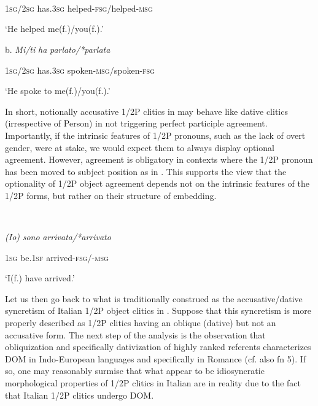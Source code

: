 \documentclass[output=paper]{langscibook}
\begin{document}
 
\\

\ea\label{ex:key:}
{}\\
\z
\ea\label{ex:key:}
\\
  \textsc{1sg/2sg}  has\textsc{.3sg}    helped\textsc{{}-fsg/}helped\textsc{{}-msg}

  ‘He helped me(f.)/you(f.).’

  b.  \textit{Mi/ti}        \textit{ha}     \textit{parlato/*parlata}

  \textsc{1sg/2sg}  has\textsc{.3sg}    spoken\textsc{{}-msg/}spoken\textsc{{}-fsg}

  ‘He spoke to me(f.)/you(f.).’
\z 

In short, notionally accusative 1/2P clitics in  may behave like dative clitics (irrespective of Person) in not triggering perfect participle agreement. Importantly, if the intrinsic features of 1/2P pronouns, such as the lack of overt gender, were at stake, we would expect them to always display optional agreement. However, agreement is obligatory in contexts where the 1/2P pronoun has been moved to subject position as in . This supports the view that the optionality of 1/2P object agreement depends not on the intrinsic features of the 1/2P forms, but rather on their structure of embedding.

\ea\label{ex:key:}
{}\\
\z

     \textit{(Io)}  \textit{sono}     \textit{arrivata/*arrivato}



  \textsc{1sg}  be.\textsc{1sf}   arrived\textsc{{}-fsg/-msg}


  ‘I(f.) have arrived.’

Let us then go back to what is traditionally construed as the accusative/dative syncretism of Italian 1/2P object clitics in .  Suppose that this syncretism is more properly described as 1/2P clitics having an oblique (dative) but not an accusative form. The next step of the analysis is the observation that obliquization and specifically dativization of highly ranked referents characterizes DOM in Indo-European languages and specifically in Romance (cf. also fn 5).  If so, one may reasonably surmise that what appear to be idiosyncratic morphological properties of 1/2P clitics in Italian are in reality due to the fact that Italian 1/2P clitics undergo DOM. 
\end{document}
